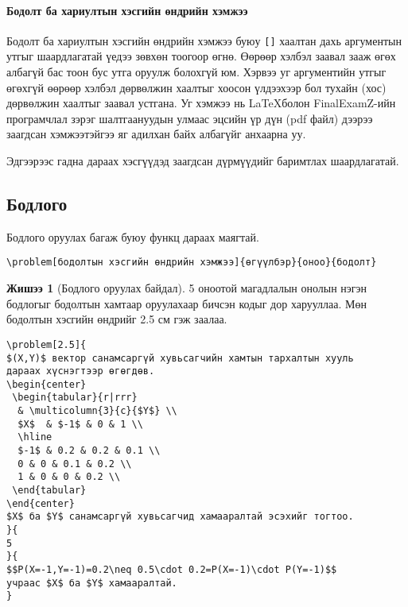 \documentclass[10pt]{article}
\theoremstyle{definition}
\newtheorem{example}{Жишээ}
\begin{document}
\paragraph{Бодолт ба хариултын хэсгийн өндрийн хэмжээ} Бодолт ба хариултын хэсгийн өндрийн хэмжээ буюу \texttt{[]} хаалтан дахь аргументын утгыг шаардлагатай үедээ зөвхөн тоогоор өгнө. Өөрөөр хэлбэл заавал зааж өгөх албагүй бас тоон бус утга оруулж болохгүй юм. Хэрвээ уг аргументийн утгыг өгөхгүй өөрөөр хэлбэл дөрвөлжин хаалтыг хоосон үлдээхээр бол тухайн (хос) дөрвөлжин хаалтыг заавал устгана. Уг хэмжээ нь \LaTeX болон FinalExamZ-ийн програмчлал зэрэг шалтгаануудын улмаас эцсийн үр дүн (pdf файл) дээрээ заагдсан хэмжээтэйгээ яг адилхан байх албагүйг анхаарна уу.

\par Эдгээрээс гадна дараах хэсгүүдэд заагдсан дүрмүүдийг баримтлах шаардлагатай.

\subsection{Бодлого}

Бодлого оруулах багаж буюу функц дараах маягтай.
\begin{verbatim}
\problem[бодолтын хэсгийн өндрийн хэмжээ]{өгүүлбэр}{оноо}{бодолт}
\end{verbatim}

\begin{example}[Бодлого оруулах байдал]
5 оноотой магадлалын онолын нэгэн бодлогыг бодолтын хамтаар оруулахаар бичсэн кодыг дор харууллаа. Мөн бодолтын хэсгийн өндрийг 2.5 см гэж заалаа.
\begin{verbatim}
\problem[2.5]{
$(X,Y)$ вектор санамсаргүй хувьсагчийн хамтын тархалтын хууль 
дараах хүснэгтээр өгөгдөв.
\begin{center}
 \begin{tabular}{r|rrr}
  & \multicolumn{3}{c}{$Y$} \\
  $X$  & $-1$ & 0 & 1 \\
  \hline
  $-1$ & 0.2 & 0.2 & 0.1 \\
  0 & 0 & 0.1 & 0.2 \\
  1 & 0 & 0 & 0.2 \\
 \end{tabular}
\end{center}
$X$ ба $Y$ санамсаргүй хувьсагчид хамааралтай эсэхийг тогтоо.
}{
5
}{
$$P(X=-1,Y=-1)=0.2\neq 0.5\cdot 0.2=P(X=-1)\cdot P(Y=-1)$$
учраас $X$ ба $Y$ хамааралтай.
}
\end{verbatim}
\end{example}
\end{document}
